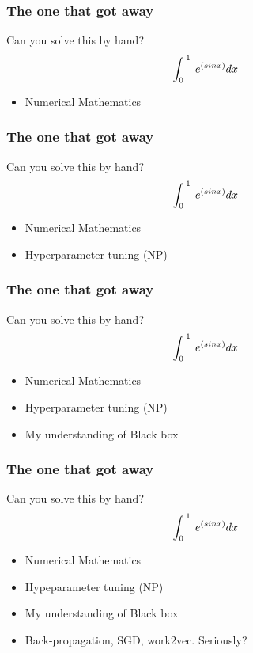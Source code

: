 \documentclass[10pt,mathserif]{beamer}
\begin{document}
\begin{frame}\frametitle{The one that got away}
\begin{block}{Can you solve this by hand?}
\[\Huge \int _{0\:}^{\:1}\:e^{\left(sinx\right)}dx\]
\end{block}
\begin{itemize}
\item Numerical Mathematics 

\end{itemize}

\end{frame}

\begin{frame}\frametitle{The one that got away}
	\begin{block}{Can you solve this by hand?}
		\[\Huge \int _{0\:}^{\:1}\:e^{\left(sinx\right)}dx\]
	\end{block}
	\begin{itemize}
		\item Numerical Mathematics 
		\item Hyperparameter tuning (NP)
	
		
	\end{itemize}
	
\end{frame}

\begin{frame}\frametitle{The one that got away}
	\begin{block}{Can you solve this by hand?}
		\[\Huge \int _{0\:}^{\:1}\:e^{\left(sinx\right)}dx\]
	\end{block}
	\begin{itemize}
		\item Numerical Mathematics 
		\item Hyperparameter tuning (NP)
		\item My understanding of Black box
 
		
	\end{itemize}
	
\end{frame}

\begin{frame}\frametitle{The one that got away}
	\begin{block}{Can you solve this by hand?}
		\[\Huge \int _{0\:}^{\:1}\:e^{\left(sinx\right)}dx\]
	\end{block}
	\begin{itemize}
		\item Numerical Mathematics 
		\item Hypeparameter tuning (NP)
		\item My understanding of Black box
		\item Back-propagation, SGD, work2vec. Seriously? 

	\end{itemize}
	
\end{frame}
\end{document}
